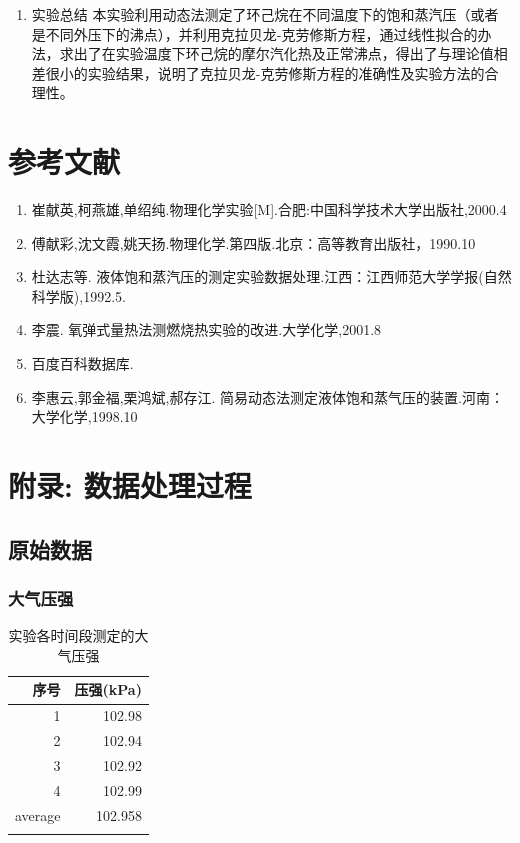 \documentclass[11pt]{report}
\begin{document}
\begin{enumerate}
\item 实验总结
\label{sec:org7694708}
本实验利用动态法测定了环己烷在不同温度下的饱和蒸汽压（或者是不同外压下的沸点），并利用克拉贝龙-克劳修斯方程，通过线性拟合的办法，求出了在实验温度下环己烷的摩尔汽化热及正常沸点，得出了与理论值相差很小的实验结果，说明了克拉贝龙-克劳修斯方程的准确性及实验方法的合理性。
\end{enumerate}
\part{参考文献}
\label{sec:org7f0381d}
\begin{enumerate}
\item 崔献英,柯燕雄,单绍纯.物理化学实验[M].合肥:中国科学技术大学出版社,2000.4
\item 傅献彩,沈文霞,姚天扬.物理化学.第四版.北京：高等教育出版社，1990.10
\item 杜达志等. 液体饱和蒸汽压的测定实验数据处理.江西：江西师范大学学报(自然科学版),1992.5.
\item 李震. 氧弹式量热法测燃烧热实验的改进.大学化学,2001.8
\item 百度百科数据库.
\item 李惠云,郭金福,栗鸿斌,郝存江. 简易动态法测定液体饱和蒸气压的装置.河南：大学化学,1998.10
\end{enumerate}

\part{附录: 数据处理过程}
\label{sec:org7c5c212}
\chapter{原始数据}
\label{sec:orgb3bddc8}
\section{大气压强}
\label{sec:org9e3fadc}
\begin{table}[htbp]
\caption{实验各时间段测定的大气压强}
\centering
\begin{tabular}{rr}
序号 & 压强(kPa)\\
\hline
1 & 102.98\\
2 & 102.94\\
3 & 102.92\\
4 & 102.99\\
average & 102.958\\
 & \\
\end{tabular}
\end{table}
\end{document}
